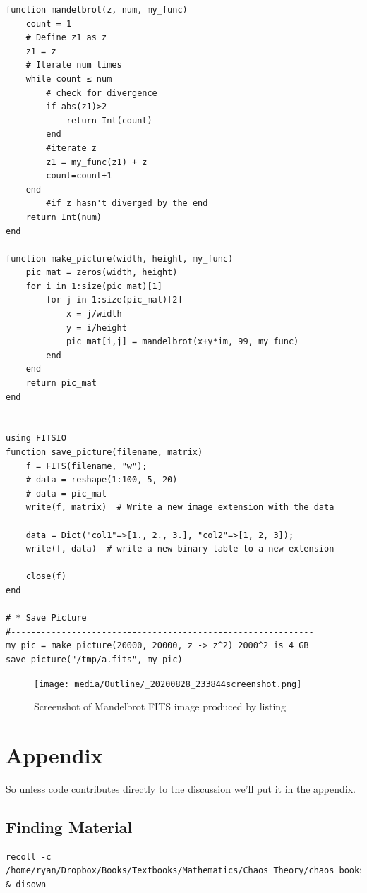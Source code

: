 \documentclass[a4paper,11pt,twoside]{article}
\begin{document}
\begin{verbatim}
function mandelbrot(z, num, my_func)
    count = 1
    # Define z1 as z
    z1 = z
    # Iterate num times
    while count ≤ num
        # check for divergence
        if abs(z1)>2
            return Int(count)
        end
        #iterate z
        z1 = my_func(z1) + z
        count=count+1
    end
        #if z hasn't diverged by the end
    return Int(num)
end

function make_picture(width, height, my_func)
    pic_mat = zeros(width, height)
    for i in 1:size(pic_mat)[1]
        for j in 1:size(pic_mat)[2]
            x = j/width
            y = i/height
            pic_mat[i,j] = mandelbrot(x+y*im, 99, my_func)
        end
    end
    return pic_mat
end


using FITSIO
function save_picture(filename, matrix)
    f = FITS(filename, "w");
    # data = reshape(1:100, 5, 20)
    # data = pic_mat
    write(f, matrix)  # Write a new image extension with the data

    data = Dict("col1"=>[1., 2., 3.], "col2"=>[1, 2, 3]);
    write(f, data)  # write a new binary table to a new extension

    close(f)
end

# * Save Picture
#------------------------------------------------------------
my_pic = make_picture(20000, 20000, z -> z^2) 2000^2 is 4 GB
save_picture("/tmp/a.fits", my_pic)

\end{verbatim}

\begin{figure}[htbp]
\centering
\texttt{[image: media/Outline/\_20200828\_233844screenshot.png]}
\caption{\label{mandelbrot-screen}Screenshot of Mandelbrot FITS image produced by listing }
\end{figure}

\section{Appendix}
\label{appendix}
So unless code contributes directly to the discussion we'll put it in the appendix.
 \appendix 
\subsection{Finding Material}
\label{sec:org87dc544}
\begin{verbatim}
recoll -c /home/ryan/Dropbox/Books/Textbooks/Mathematics/Chaos_Theory/chaos_books_recoll & disown
\end{verbatim}
\end{document}
